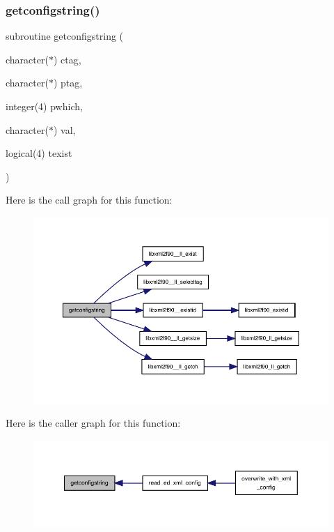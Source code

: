 \subsubsection{\texorpdfstring{getconfigstring()}{getconfigstring()}}
{\footnotesize\ttfamily subroutine getconfigstring (\begin{DoxyParamCaption}\item[{character($\ast$)}]{ctag,  }\item[{character($\ast$)}]{ptag,  }\item[{integer(4)}]{pwhich,  }\item[{character($\ast$)}]{val,  }\item[{logical(4)}]{texist }\end{DoxyParamCaption})}

Here is the call graph for this function\+:
\nopagebreak
\begin{figure}[H]
\begin{center}
\leavevmode
\includegraphics[width=350pt]{ed__xml__config_8f90_af0adc799495cd223935aceec004ccb11_cgraph}
\end{center}
\end{figure}
Here is the caller graph for this function\+:
\nopagebreak
\begin{figure}[H]
\begin{center}
\leavevmode
\includegraphics[width=350pt]{ed__xml__config_8f90_af0adc799495cd223935aceec004ccb11_icgraph}
\end{center}
\end{figure}
\mbox{\label{ed__xml__config_8f90_a026dfa9d8dcef5376fdabe6f581cc5e6}} 
